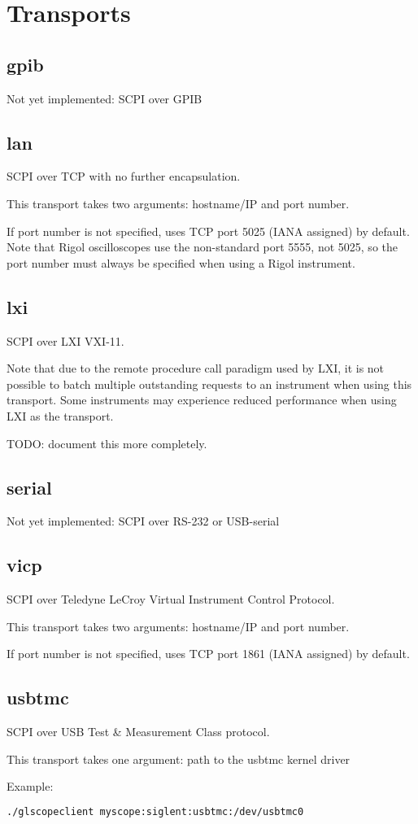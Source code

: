 \chapter{Transports}
\label{sec:transports}

\section{gpib}

Not yet implemented: SCPI over GPIB

\section{lan}

SCPI over TCP with no further encapsulation.

This transport takes two arguments: hostname/IP and port number.

If port number is not specified, uses TCP port 5025 (IANA assigned) by default. Note that Rigol oscilloscopes use the
non-standard port 5555, not 5025, so the port number must always be specified when using a Rigol instrument.

\section{lxi}

SCPI over LXI VXI-11.

Note that due to the remote procedure call paradigm used by LXI, it is not possible to batch multiple outstanding
requests to an instrument when using this transport. Some instruments may experience reduced performance when using LXI
as the transport.

TODO: document this more completely.

\section{serial}

Not yet implemented: SCPI over RS-232 or USB-serial

\section{vicp}

SCPI over Teledyne LeCroy Virtual Instrument Control Protocol.

This transport takes two arguments: hostname/IP and port number.

If port number is not specified, uses TCP port 1861 (IANA assigned) by default.

\section{usbtmc}

SCPI over USB Test \& Measurement Class protocol.

This transport takes one argument: path to the usbtmc kernel driver

Example:
\begin{lstlisting}[language=sh]
./glscopeclient myscope:siglent:usbtmc:/dev/usbtmc0
\end{lstlisting}


